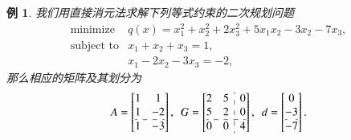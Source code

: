 \documentclass{SBCbookchapter}
\newtheorem{eg}[thm]{例}
\numberwithin{equation}{section}
\begin{document}
\begin{eg}
\label{eg:7.2.1}
我们用直接消元法求解下列等式约束的二次规划问题
\begin{equation*}
\begin{array}{cl}
\text{minimize} & q(x) = x_1^2 + x_2^2 + 2x_3^2 + 5x_1x_2 - 3x_2 - 7x_3, \\
\text{subject to} & x_1 + x_2 + x_3 = 1, \\
& x_1 - 2x_2 - 3x_3 = -2,
\end{array}
\end{equation*}
那么相应的矩阵及其划分为
\begin{equation*}
A = \left[\begin{array}{@{}cc@{}} 1 & 1 \\ 1 & -2 \\ \hdashline 1 & -3 \end{array}\right], ~~ G = \left[\begin{array}{@{}cc:c@{}} 2 & 5 & 0 \\ 5 & 2 & 0 \\ \hdashline 0 & 0 & 4 \end{array}\right], ~~ d = \left[\begin{array}{@{}c@{}} 0 \\ -3 \\ \hdashline -7 \end{array}\right].
\end{equation*}


\end{eg}
\end{document}

